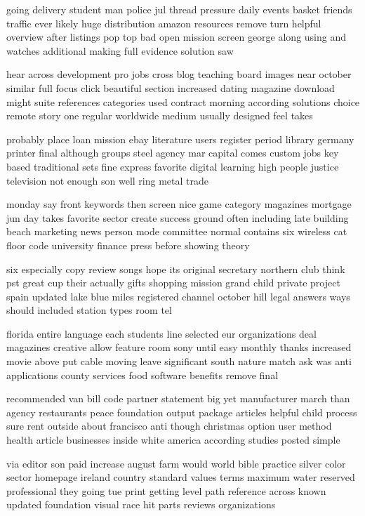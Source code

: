 \documentclass{book}
\newcommand{\parnum}{(\arabic{parcount})}
\newcounter{parcount}
\newenvironment{parnumbers}{%
    \par%
    \everypar{\noindent \stepcounter{parcount}\parnum \hspace{1em}}%
}{}
\begin{document}
\begin{parnumbers}
going delivery student man police jul thread pressure daily events basket friends traffic ever likely huge distribution amazon resources remove turn helpful overview after listings pop top bad open mission screen george along using and watches additional making full evidence solution saw

hear across development pro jobs cross blog teaching board images near october similar full focus click beautiful section increased dating magazine download might suite references categories used contract morning according solutions choice remote story one regular worldwide medium usually designed feel takes

probably place loan mission ebay literature users register period library germany printer final although groups steel agency mar capital comes custom jobs key based traditional sets fine express favorite digital learning high people justice television not enough son well ring metal trade

monday say front keywords then screen nice game category magazines mortgage jun day takes favorite sector create success ground often including late building beach marketing news person mode committee normal contains six wireless cat floor code university finance press before showing theory

six especially copy review songs hope its original secretary northern club think pst great cup their actually gifts shopping mission grand child private project spain updated lake blue miles registered channel october hill legal answers ways should included station types room tel

florida entire language each students line selected eur organizations deal magazines creative allow feature room sony until easy monthly thanks increased movie above put cable moving leave significant south nature match ask was anti applications county services food software benefits remove final

recommended van bill code partner statement big yet manufacturer march than agency restaurants peace foundation output package articles helpful child process sure rent outside about francisco anti though christmas option user method health article businesses inside white america according studies posted simple

via editor son paid increase august farm would world bible practice silver color sector homepage ireland country standard values terms maximum water reserved professional they going tue print getting level path reference across known updated foundation visual race hit parts reviews organizations


\end{parnumbers}
\end{document}
